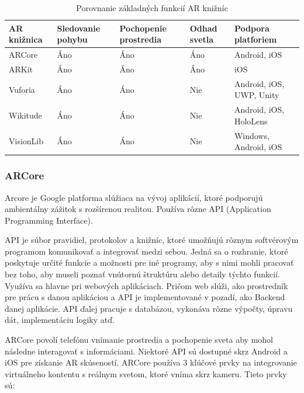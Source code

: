 \begin{table}[h]
\centering
\caption{Porovnanie základných funkcií AR knižníc}
\label{tab:ar-features}
\begin{tabularx}{\textwidth}{|l|X|X|X|X|}
\hline
\textbf{AR knižnica} & \textbf{Sledovanie pohybu} & \textbf{Pochopenie prostredia} & \textbf{Odhad svetla} & \textbf{Podpora platforiem} \\ \hline
ARCore & Áno & Áno & Áno & Android, iOS \\ \hline
ARKit & Áno & Áno & Áno & iOS \\ \hline
Vuforia & Áno & Áno & Nie & Android, iOS, UWP, Unity \\ \hline
Wikitude & Áno & Áno & Nie & Android, iOS, HoloLens \\ \hline
VisionLib & Áno & Áno & Nie & Windows, Android, iOS \\ \hline
\end{tabularx}
\end{table}

\subsubsection{ARCore}

Arcore je Google platforma slúžiaca na vývoj aplikácií, ktoré podporujú ambientálny zážitok s rozšírenou realitou. Používa rôzne API (Application Programming Interface). \cite{google2024arcore}

API je súbor pravidiel, protokolov a knižníc, ktoré umožňujú rôznym softvérovým programom komunikovať a integrovať medzi sebou. Jedná sa o rozhranie, ktoré poskytuje určité funkcie a možnosti pre iné programy, aby s nimi mohli pracovať bez toho, aby museli poznať vnútornú štruktúru alebo detaily týchto funkcií. Využíva sa hlavne pri webových aplikáciach. Pričom web slúži, ako prostredník pre prácu s danou aplikáciou a API je implementované v pozadí, ako Backend danej aplikácie. API ďalej pracuje s databázou, vykonáva rôzne výpočty, úpravu dát, implementáciu logiky atď. \cite{kodouskova2020api}

ARCore povolí telefónu vnímanie prostredia a pochopenie sveta aby mohol následne interagovať s informáciami. Niektoré API sú dostupné skrz Android a iOS pre získanie AR skúseností. ARCore používa 3 kľúčové prvky na integrovanie virtuálneho kontentu s reálnym svetom, ktoré vníma skrz kameru. Tieto prvky sú:

